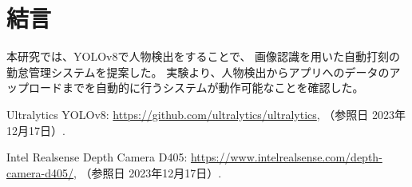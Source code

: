 \documentclass[10pt]{jarticle}
\begin{document}

    \section{結\hspace{2zw}言}%
本研究では、YOLOv8で人物検出をすることで、
画像認識を用いた自動打刻の勤怠管理システムを提案した。
実験より、人物検出からアプリへのデータのアップロードまでを自動的に行うシステムが動作可能なことを確認した。

    \vspace{5truemm}
    {\footnotesize
        \begin{thebibliography}{99}

            Ultralytics YOLOv8: 
            \url{https://github.com/ultralytics/ultralytics}, 
            （参照日 2023年12月17日）.

            Intel Realsense Depth Camera D405: 
            \url{https://www.intelrealsense.com/depth-camera-d405/}, 
            （参照日 2023年12月17日）.

        \end{thebibliography}
    }
    \normalsize
\end{document}
